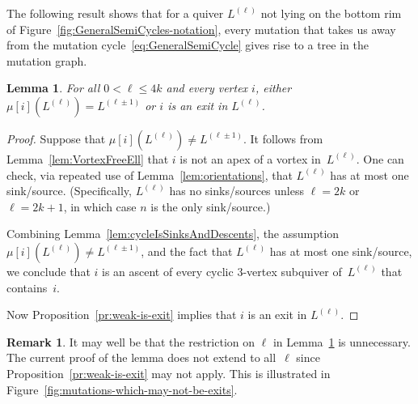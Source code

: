 \documentclass[11pt, letterpaper]{amsart}
\newtheorem{lemma}[theorem]{Lemma}
\theoremstyle{definition}
\newtheorem{remark}[theorem]{Remark}
\numberwithin{equation}{section}
\newcommand{\T}[2]{\mu[#1](#2)} %
\begin{document}
The following result shows that for a quiver $L^{(\ell)}$ 
not lying on the bottom rim of Figure~\ref{fig:GeneralSemiCycles-notation},
every mutation that takes us away from the mutation cycle~\eqref{eq:GeneralSemiCycle}
gives rise to a tree in the mutation graph. 

\begin{lemma}
\label{lem:cycle-exits}
For all $0 < \ell \le 4k$ and every vertex $i$, either 
$\T{i}{L^{(\ell)}} = L^{(\ell \pm 1)}$ or 
$i$ is an exit in $L^{(\ell)}$.
\end{lemma}

\begin{proof}
Suppose that $\T{i}{L^{(\ell)}} \neq L^{(\ell \pm 1)}$.
It follows from Lemma~\ref{lem:VortexFreeEll} that $i$ is not an apex of a vortex in~$L^{(\ell)}$. 
One can check, via repeated use of Lemma~\ref{lem:orientations}, 
that $L^{(\ell)}$ has at most one sink/source. 
(Specifically, $L^{(\ell)}$ has no sinks/sources unless $\ell = 2k$ or $\ell=2k+1$, 
in which case $n$ is the only sink/source.)

Combining  Lemma~\ref{lem:cycleIsSinksAndDescents},
the assumption $\T{i}{L^{(\ell)}} \neq L^{(\ell \pm 1)}$, and the fact that $L^{(\ell)}$ has at most one sink/source, 
we conclude that $i$ is an ascent of every cyclic $3$-vertex subquiver of~$L^{(\ell)}$ that contains~$i$.

Now Proposition~\ref{pr:weak-is-exit} implies that $i$ is an exit in $L^{(\ell)}$. 
\end{proof}

\begin{remark}
It may well be that the restriction on $\ell$ in Lemma~\ref{lem:cycle-exits} is unnecessary. 
The current proof of the lemma does not extend to all~$\ell$ since Proposition~\ref{pr:weak-is-exit} may not apply. 
This is illustrated in Figure~\ref{fig:mutations-which-may-not-be-exits}.
\end{remark}
\end{document}
